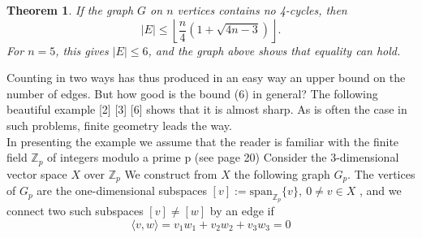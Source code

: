 \documentclass[10pt,twoside]{book}
\newtheorem*{theorem}{Theorem}
\begin{document}
		\begin{theorem}
			If the graph $G$ on $n$ vertices contains no 4-cycles, then
			\begin{equation}
				|E| \leq \left\lfloor \frac{n}{4} \left(1 + \sqrt{4n - 3}\right) \right\rfloor. \tag{6}
			\end{equation}
			For $n = 5$, this gives $|E| \leq 6$, and the graph above shows that equality can hold.
		\end{theorem}
		
		Counting in two ways has thus produced in an easy way an upper bound on the number of edges. But how good is the bound (6) in general? The following beautiful example [2] [3] [6] shows that it is almost sharp. As is often the case in such problems, finite geometry leads the way.\\
		In presenting the example we assume that the reader is familiar with the finite field $\mathbb{Z}_p$ of integers modulo a prime p (see page 20) 
		Consider the 3-dimensional vector space $X$ over $\mathbb{Z}_p$ We construct from $X$ the following graph $G_p$. The vertices of $G_p$ are the one-dimensional subspaces $[v] := \text{span}_{\mathbb{Z}_p}\{v\},\ 0 \neq v \in X$ , and we connect two such subspaces $[v] \neq [w]$ by an edge if
		$$\langle v, w \rangle = v_1w_1 + v_2w_2 + v_3w_3 = 0$$
\end{document}
